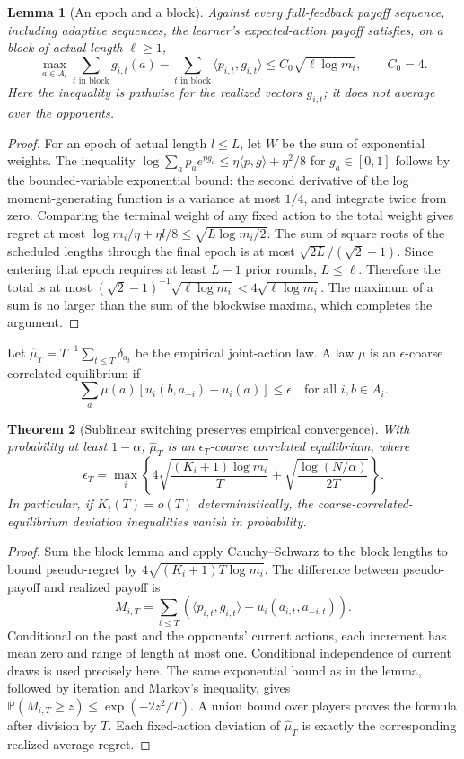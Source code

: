 \documentclass[11pt,a4paper]{article}
\newtheorem{theorem}{Theorem}[section]
\newtheorem{lemma}[theorem]{Lemma}
\theoremstyle{remark}
\newcommand{\Prob}{\mathbb P}
\begin{document}
\begin{lemma}[An epoch and a block]
Against every full-feedback payoff sequence, including adaptive sequences, the learner's expected-action payoff satisfies, on a block of actual length $\ell\ge1$,
\[
 \max_{a\in A_i}\sum_{t\text{ in block}}g_{i,t}(a)
 -\sum_{t\text{ in block}}\langle p_{i,t},g_{i,t}\rangle
 \le C_0\sqrt{\ell\log m_i},\qquad C_0=4.
\]
Here the inequality is pathwise for the realized vectors $g_{i,t}$; it does not average over the opponents.
\end{lemma}
\begin{proof}
For an epoch of actual length $l\le L$, let $W$ be the sum of exponential weights. The inequality
$\log\sum_a p_a e^{\eta g_a}\le\eta\langle p,g\rangle+\eta^2/8$ for $g_a\in[0,1]$ follows by the bounded-variable exponential bound: the second derivative of the log moment-generating function is a variance at most $1/4$, and integrate twice from zero. Comparing the terminal weight of any fixed action to the total weight gives regret at most $\log m_i/\eta+\eta l/8\le\sqrt{L\log m_i/2}$. The sum of square roots of the scheduled lengths through the final epoch is at most $\sqrt{2L}/(\sqrt2-1)$. Since entering that epoch requires at least $L-1$ prior rounds, $L\le\ell$. Therefore the total is at most $(\sqrt2-1)^{-1}\sqrt{\ell\log m_i}<4\sqrt{\ell\log m_i}$. The maximum of a sum is no larger than the sum of the blockwise maxima, which completes the argument.
\end{proof}

Let $\widehat\mu_T=T^{-1}\sum_{t\le T}\delta_{a_t}$ be the empirical joint-action law. A law $\mu$ is an $\epsilon$-coarse correlated equilibrium if
\[
 \sum_a\mu(a)[u_i(b,a_{-i})-u_i(a)]\le\epsilon
 \quad\text{for all }i,b\in A_i.
\]
\begin{theorem}[Sublinear switching preserves empirical convergence]
With probability at least $1-\alpha$, $\widehat\mu_T$ is an $\epsilon_T$-coarse correlated equilibrium, where
\[
 \epsilon_T=\max_i\left\{
 4\sqrt{\frac{(K_i+1)\log m_i}{T}}
 +\sqrt{\frac{\log(N/\alpha)}{2T}}\right\}.
\]
In particular, if $K_i(T)=o(T)$ deterministically, the coarse-correlated-equilibrium deviation inequalities vanish in probability.
\end{theorem}
\begin{proof}
Sum the block lemma and apply Cauchy--Schwarz to the block lengths to bound pseudo-regret by $4\sqrt{(K_i+1)T\log m_i}$. The difference between pseudo-payoff and realized payoff is
\[
 M_{i,T}=\sum_{t\le T}\left(\langle p_{i,t},g_{i,t}\rangle-u_i(a_{i,t},a_{-i,t})\right).
\]
Conditional on the past and the opponents' current actions, each increment has mean zero and range of length at most one. Conditional independence of current draws is used precisely here. The same exponential bound as in the lemma, followed by iteration and Markov's inequality, gives
$\Prob(M_{i,T}\ge z)\le\exp(-2z^2/T)$. A union bound over players proves the formula after division by $T$. Each fixed-action deviation of $\widehat\mu_T$ is exactly the corresponding realized average regret.
\end{proof}
\end{document}
